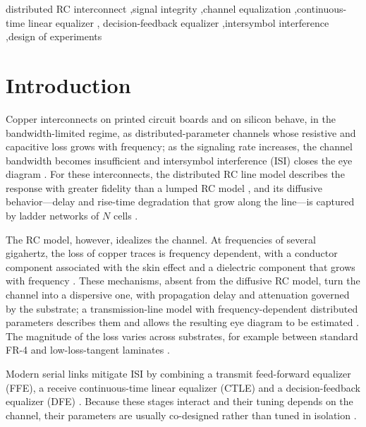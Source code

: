 \documentclass[preprint,review,12pt]{elsarticle}
\begin{document}
\begin{frontmatter}
\begin{keyword}
distributed RC interconnect \sep signal integrity \sep channel
equalization \sep continuous-time linear equalizer \sep
decision-feedback equalizer \sep intersymbol interference \sep design of experiments
\end{keyword}

\end{frontmatter}

\section{Introduction}
\label{sec:intro}

Copper interconnects on printed circuit boards and on silicon behave, in
the bandwidth-limited regime, as distributed-parameter channels whose
resistive and capacitive loss grows with frequency; as the signaling rate
increases, the channel bandwidth becomes insufficient and intersymbol
interference (ISI) closes the eye diagram \citep{10370948}. For these
interconnects, the distributed RC line model describes the response with
greater fidelity than a lumped RC model \citep{761200}, and its diffusive
behavior---delay and rise-time degradation that grow along the line---is
captured by ladder networks of $N$ cells \citep{5697500}.

The RC model, however, idealizes the channel. At frequencies of several
gigahertz, the loss of copper traces is frequency dependent, with a
conductor component associated with the skin effect and a dielectric
component that grows with frequency \citep{9888577,915226}. These
mechanisms, absent from the diffusive RC model, turn the channel into a
dispersive one, with propagation delay and attenuation governed by the
substrate; a transmission-line model with frequency-dependent distributed
parameters describes them and allows the resulting eye diagram to be
estimated \citep{8861405,7445206}. The magnitude of the loss varies across
substrates, for example between standard FR-4 and low-loss-tangent
laminates \citep{9785524,10385078}.

Modern serial links mitigate ISI by combining a transmit feed-forward
equalizer (FFE), a receive continuous-time linear equalizer (CTLE) and a
decision-feedback equalizer (DFE) \citep{10260232,10811094}. Because these
stages interact and their tuning depends on the channel, their parameters
are usually co-designed rather than tuned in isolation \citep{11169790}.
\end{document}
